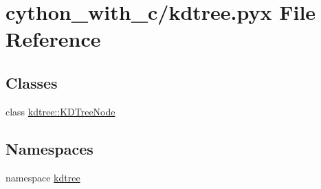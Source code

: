 \hypertarget{cython__with__c_2kdtree_8pyx}{
\section{cython\_\-with\_\-c/kdtree.pyx File Reference}
\label{cython__with__c_2kdtree_8pyx}
}
\subsection*{Classes}
\begin{DoxyCompactItemize}
\item 
class \hyperlink{classkdtree_1_1KDTreeNode}{kdtree::KDTreeNode}
\end{DoxyCompactItemize}
\subsection*{Namespaces}
\begin{DoxyCompactItemize}
\item 
namespace \hyperlink{namespacekdtree}{kdtree}
\end{DoxyCompactItemize}
